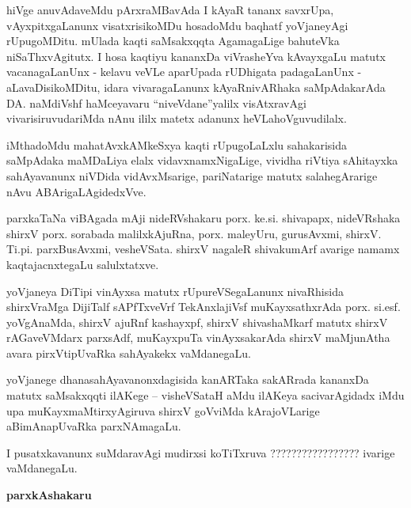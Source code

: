 \smallskip

hiVge anuvAdaveMdu pArxraMBavAda I kAyaR tananx savxrUpa, vAyxpitxgaLanunx visatxrisikoMDu hosadoMdu baqhatf yoVjane\-yAgi rUpugoMDitu. mUlada kaqti saMsakxqqta AgamagaLige bahuteVka niSaThxvAgitutx. I hosa kaqtiyu kananxDa viVrasheYva kAvayxgaLu matutx vacanagaLanUnx - kelavu veVLe aparUpada rUDhigata padagaLanUnx - aLavaDisikoMDitu, idara vivaragaLanunx kAyaR\-nivARhaka saMpAdakarAda DA. naMdiVshf haMceyavaru ``niveVdane''yalilx visAtxravAgi vivarisiruvudariMda nAnu ililx matetx adanunx heVLahoVguvudilalx.

\smallskip

iMthadoMdu mahatAvxkAMkeSxya kaqti rUpugoLaLxlu sahakarisida saMpAdaka maMDaLiya elalx vidavxnamxNigaLige, vividha riVtiya sAhitayxka sahAyavanunx niVDida vidAvxMsarige, pariNatarige matutx salahegArarige nAvu ABArigaLAgidedxVve.

\smallskip

parxkaTaNa viBAgada mAji nideRVshakaru porx. ke.si. shivapapx, nideVRshaka shirxV porx. sorabada malilxkAjuRna, porx. maleyUru, gurusAvxmi, shirxV. Ti.pi. parxBusAvxmi, vesheVSata. shirxV nagaleR shivakumArf avarige namamx kaqtajacnxtegaLu salulxtatxve.

\smallskip

yoVjaneya DiTipi vinAyxsa matutx rUpureVSegaLanunx nivaRhisida shirxVraMga DijiTalf sAPfTxveVrf TekAnxlajiVsf muKayxsathxrAda porx. si.esf. yoVgAnaMda, shirxV ajuRnf kashayxpf, shirxV shivashaMkarf matutx shirxV rAGaveVMdarx parxsAdf, muKayxpuTa vinAyxsakarAda shirxV maMjunAtha avara pirxVtipUvaRka sahAyakekx vaMdanegaLu.

\smallskip

yoVjanege dhanasahAyavanonxdagisida kanARTaka sakARrada kananxDa matutx saMsakxqqti ilAKege -- visheVSataH aMdu ilAKeya sacivarAgidadx iMdu upa muKayxmaMtirxyAgiruva shirxV goVviMda kArajoVLarige aBimAnapUvaRka parxNAmagaLu.

I pusatxkavanunx suMdaravAgi mudirxsi koTiTxruva ????????????????? ivarige vaMdanegaLu.

\vskip 1cm

\hfill {\bf parxkAshakaru}
